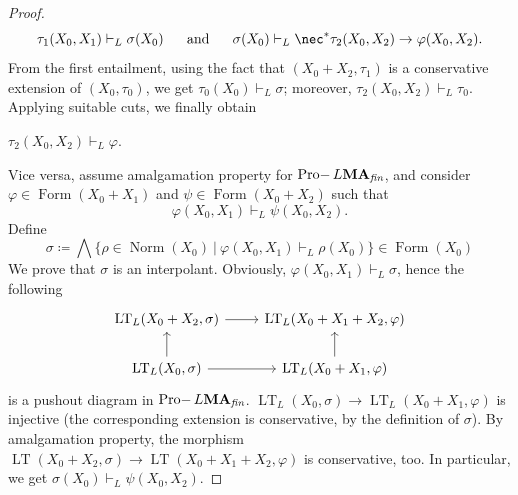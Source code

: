\documentclass{article}
\theoremstyle{definition}
\DeclareMathOperator{\LT}{LT}
\DeclareMathOperator{\Formulas}{Form}
\DeclareMathOperator{\Pro}{Pro-}
\DeclareMathOperator{\Norm}{Norm}
\newcommand{\MA}{\textup{\textbf{MA}}}
\newcommand{\fin}{\textit{fin}}
\begin{document}
\begin{proof}
$$\tau_1(X_0,X_1) \vdash_L \sigma(X_0) ~~~~~\text{and}~~~~~ \sigma(X_0) \vdash_L \nec^* \tau_2(X_0,X_2) \rightarrow \varphi(X_0,X_2).$$
From the first entailment, using the fact that $(X_0 + X_2,\tau_1)$ is a conservative extension of $(X_0,\tau_0)$,
we get $\tau_0(X_0) \vdash_L \sigma$; moreover, $\tau_2(X_0,X_2)\vdash_L \tau_0$.
Applying suitable cuts, we finally obtain

$\tau_2(X_0,X_2) \vdash_L \varphi$.

Vice versa, assume amalgamation property for $\Pro L\MA_\fin$, and consider $\varphi \in \Formulas(X_0+X_1)$ and $\psi \in \Formulas(X_0+X_2)$ such that
$$\varphi(X_0,X_1) \vdash_L \psi(X_0,X_2).$$
Define
$$\sigma \coloneqq \bigwedge \{\rho \in \Norm(X_0)\ \vert\ \varphi(X_0,X_1) \vdash_L \rho(X_0)\} \in \Formulas(X_0)$$
We prove that $\sigma$ is an interpolant. Obviously, $\varphi(X_0,X_1) \vdash_L \sigma$, hence the following
\[\begin{tikzcd}[ampersand replacement=\&]
	{\LT_L(X_0 + X_2,\sigma)} \& {\LT_L(X_0 + X_1 + X_2,\varphi)} \\
	{\LT_L(X_0,\sigma)} \& {\LT_L(X_0 + X_1,\varphi)}
	\arrow[from=1-1, to=1-2]
	\arrow[from=2-1, to=1-1]
	\arrow[from=2-1, to=2-2]
	\arrow[from=2-2, to=1-2]
\end{tikzcd}\]
is a pushout diagram in $\Pro L\MA_\fin$. $\LT_L(X_0,\sigma) \longrightarrow \LT_L(X_0 + X_1,\varphi)$ is injective (the corresponding extension is conservative, by the definition of $\sigma$). By amalgamation property, the morphism $\LT(X_0 + X_2,\sigma) \longrightarrow \LT(X_0 + X_1 + X_2,\varphi)$ is conservative, too. In particular, we get $\sigma(X_0) \vdash_L \psi(X_0,X_2)$.
\end{proof}
\end{document}
